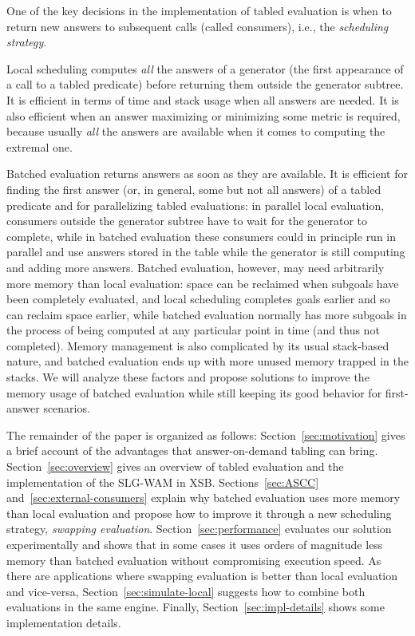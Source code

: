 \documentclass{./tlp}
\begin{document}
One of the key decisions in the implementation of tabled evaluation is
when to return new answers to subsequent calls (called consumers),
i.e., the \emph{scheduling strategy}. 

Local scheduling computes \emph{all} the answers of a generator (the
first appearance of a call to a tabled predicate) before returning
them outside the generator subtree.  It is efficient in terms of time
and stack usage when all answers are needed. It is also efficient when an answer maximizing or minimizing some
metric is required, because usually \emph{all} the answers are
available when it comes to computing the extremal one.

Batched evaluation returns answers as soon as they are available.  It
is efficient for finding the first answer (or, in general, some but
not all answers) of a tabled predicate and for parallelizing tabled
evaluations: in parallel local evaluation, consumers outside the
generator subtree have to wait for the generator to complete, while in
batched evaluation these consumers could in principle run in parallel
and use answers stored in the table while the generator is still
computing and adding more answers.
Batched evaluation, however, may need arbitrarily more memory than
local evaluation: space can be reclaimed when subgoals have been
completely evaluated, and local scheduling completes goals earlier and
so can reclaim space earlier, while batched evaluation normally has
more subgoals in the process of being computed at any particular point
in time (and thus not completed).  Memory management is also
complicated by its usual stack-based nature, and batched evaluation
ends up with more unused memory trapped in the stacks.
We will analyze these factors and propose solutions to improve the
memory usage of batched evaluation while still keeping its good
behavior for first-answer scenarios.



The remainder of the paper is organized as follows:
Section~\ref{sec:motivation} gives a brief account of the advantages
that answer-on-demand tabling can bring.  Section~\ref{sec:overview}
gives an overview of tabled evaluation and the implementation of the
SLG-WAM in XSB.  Sections~\ref{sec:ASCC}
and~\ref{sec:external-consumers} explain why batched evaluation uses
more memory than local evaluation and propose how to improve it
through a new scheduling strategy, \emph{swapping
  evaluation}. Section~\ref{sec:performance} evaluates our solution
experimentally and shows that in some cases it uses orders of
magnitude less memory than batched evaluation without compromising
execution speed. As there are applications where swapping evaluation
is better than local evaluation and vice-versa,
Section~\ref{sec:simulate-local} suggests how to combine both
evaluations in the same engine. Finally,
Section~\ref{sec:impl-details} shows some implementation details. 
\end{document}
